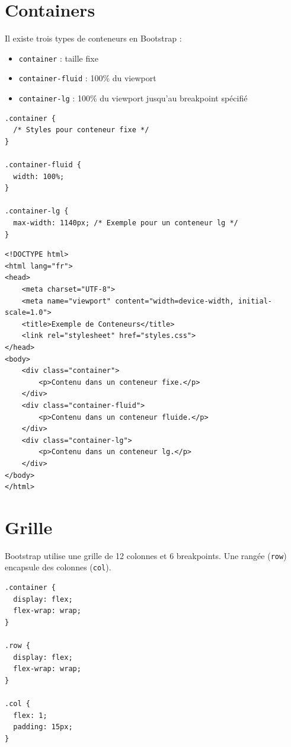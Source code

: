 \documentclass{report}
\begin{document}
\begin{multicols*}{2}
\section*{Containers}

\noindent Il existe trois types de conteneurs en Bootstrap :
\begin{itemize}
    \item \texttt{container} : taille fixe
    \item \texttt{container-fluid} : 100\% du viewport
    \item \texttt{container-lg} : 100\% du viewport jusqu'au breakpoint spécifié
\end{itemize}

\begin{lstlisting}[style=CSSDraculaLight]
.container {
  /* Styles pour conteneur fixe */
}

.container-fluid {
  width: 100%;
}

.container-lg {
  max-width: 1140px; /* Exemple pour un conteneur lg */
}
\end{lstlisting}

\begin{lstlisting}[style=HTMLDraculaDark]
<!DOCTYPE html>
<html lang="fr">
<head>
    <meta charset="UTF-8">
    <meta name="viewport" content="width=device-width, initial-scale=1.0">
    <title>Exemple de Conteneurs</title>
    <link rel="stylesheet" href="styles.css">
</head>
<body>
    <div class="container">
        <p>Contenu dans un conteneur fixe.</p>
    </div>
    <div class="container-fluid">
        <p>Contenu dans un conteneur fluide.</p>
    </div>
    <div class="container-lg">
        <p>Contenu dans un conteneur lg.</p>
    </div>
</body>
</html>
\end{lstlisting}


\section*{Grille}

\noindent Bootstrap utilise une grille de 12 colonnes et 6 breakpoints. Une rangée (\texttt{row}) encapsule des colonnes (\texttt{col}).

\begin{lstlisting}[style=CSSDraculaLight]
.container {
  display: flex;
  flex-wrap: wrap;
}

.row {
  display: flex;
  flex-wrap: wrap;
}

.col {
  flex: 1;
  padding: 15px;
}
\end{lstlisting}


\end{multicols*}
\end{document}

